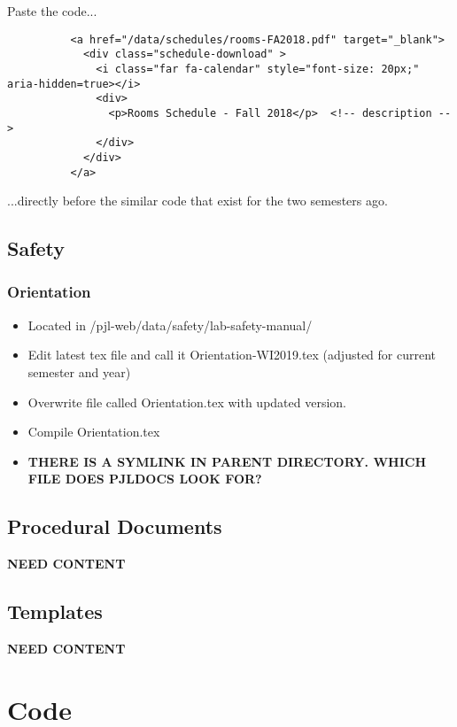 \documentclass[justified]{pjlProcessDocs}
\begin{document}
\begin{enumerate}
Paste the code...
\begin{lstlisting}
          <a href="/data/schedules/rooms-FA2018.pdf" target="_blank">
            <div class="schedule-download" >
              <i class="far fa-calendar" style="font-size: 20px;" aria-hidden=true></i> 
              <div>
                <p>Rooms Schedule - Fall 2018</p>  <!-- description -->
              </div>
            </div>
          </a>
\end{lstlisting}

...directly before the similar code that exist for the two semesters ago.

\end{enumerate}

\section{Safety}

\subsection{Orientation}
\begin{itemize}
\item Located in /pjl-web/data/safety/lab-safety-manual/
\item Edit latest tex file and call it Orientation-WI2019.tex (adjusted for current semester and year)
\item Overwrite file called Orientation.tex with updated version. 
\item Compile Orientation.tex
\item {\bf THERE IS A SYMLINK IN PARENT DIRECTORY. WHICH FILE DOES PJLDOCS LOOK FOR?}
\end{itemize}

\section{Procedural Documents}

{\bf NEED CONTENT}

\section{Templates}

{\bf NEED CONTENT}

\chapter{Code}
\end{document}
